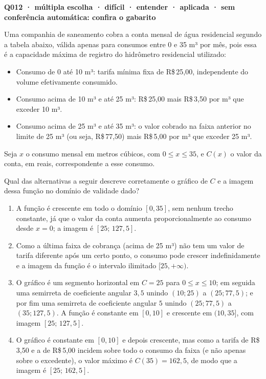 \documentclass[11pt,a4paper]{article}
\begin{document}
\bigskip\noindent\textbf{Q012 · múltipla escolha · difícil · entender · aplicada · sem conferência automática: confira o gabarito}\par\nopagebreak
Uma companhia de saneamento cobra a conta mensal de água residencial segundo a tabela abaixo, válida apenas para consumos entre 0 e 35 m³ por mês, pois essa é a capacidade máxima de registro do hidrômetro residencial utilizado:

\begin{itemize}[nosep,leftmargin=*]
\item Consumo de 0 até 10 m³: tarifa mínima fixa de R\$\,25,00, independente do volume efetivamente consumido.
\item Consumo acima de 10 m³ e até 25 m³: R\$\,25,00 mais R\$\,3,50 por m³ que exceder 10 m³.
\item Consumo acima de 25 m³ e até 35 m³: o valor cobrado na faixa anterior no limite de 25 m³ (ou seja, R\$\,77,50) mais R\$\,5,00 por m³ que exceder 25 m³.
\end{itemize}

Seja $x$ o consumo mensal em metros cúbicos, com $0 \le x \le 35$, e $C(x)$ o valor da conta, em reais, correspondente a esse consumo.

Qual das alternativas a seguir descreve corretamente o gráfico de $C$ e a imagem dessa função no domínio de validade dado?
\begin{enumerate}[label=(\alph*)]
\item A função é crescente em todo o domínio $[0,35]$, sem nenhum trecho constante, já que o valor da conta aumenta proporcionalmente ao consumo desde $x=0$; a imagem é $[25;\,127{,}5]$.
\item Como a última faixa de cobrança (acima de 25 m³) não tem um valor de tarifa diferente após um certo ponto, o consumo pode crescer indefinidamente e a imagem da função é o intervalo ilimitado $[25, +\infty)$.
\item O gráfico é um segmento horizontal em $C=25$ para $0 \le x \le 10$; em seguida uma semirreta de coeficiente angular $3{,}5$ unindo $(10;25)$ a $(25;77{,}5)$; e por fim uma semirreta de coeficiente angular $5$ unindo $(25;77{,}5)$ a $(35;127{,}5)$. A função é constante em $[0,10]$ e crescente em $(10,35]$, com imagem $[25;\,127{,}5]$.
\item O gráfico é constante em $[0,10]$ e depois crescente, mas como a tarifa de R\$\,3,50 e a de R\$\,5,00 incidem sobre todo o consumo da faixa (e não apenas sobre o excedente), o valor máximo é $C(35) = 162{,}5$, de modo que a imagem é $[25;\,162{,}5]$.
\end{enumerate}
\end{document}
